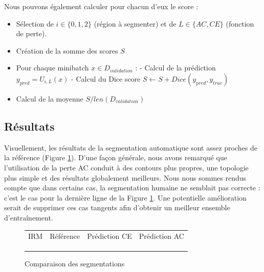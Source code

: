 \documentclass{article}
\begin{document}
Nous pouvons également calculer pour chacun d'eux le score :

\vspace{5pt}
\begin{itemize}
\item Sélection de $i \in \{0, 1, 2\}$ (région à segmenter) et de $L \in \{ AC, CE\}$ (fonction de perte).
\item Création de la somme des scores $S$

\item Pour chaque minibatch $x \in D_{validation}$ :
\subitem - Calcul de la prédiction $y_{pred} = U_{i, L}(x)$
\subitem - Calcul du Dice score $S \leftarrow S +  Dice(y_{pred}, y_{true})$
\item Calcul de la moyenne $S/len(D_{validation})$
\end{itemize} 
\vspace{5pt}


\subsection{Résultats}

Visuellement, les résultats de la segmentation automatique sont assez proches de la référence (Figure \ref{fig:results}). D'une façon générale, nous avons remarqué que l'utilisation de la perte AC conduit à des contours plus propres, une topologie plus simple et des résultats globalement meilleurs. Nous nous sommes rendus compte que dans certains cas, la segmentation humaine ne semblait pas correcte : c'est le cas pour la dernière ligne de la Figure \ref{fig:results}. Une potentielle amélioration serait de supprimer ces cas tangents afin d'obtenir un meilleur ensemble d'entraînement.


\begin{figure}[!h]
\centering
\begin{tabular}{cccc}
IRM & Référence & Prédiction CE & Prédiction  AC \\
       
  &  &  &   \\

  &  &  &   \\
       
  &  &  &   \\
\end{tabular}
\caption{\label{fig:results} Comparaison des segmentations}
\end{figure}
\end{document}
